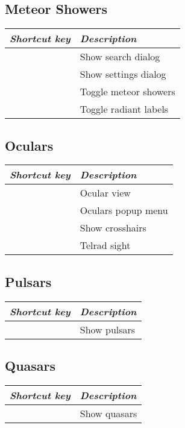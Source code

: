 \subsection{Meteor Showers}
\label{ch:Hotkeys:Plugins:MeteorShowers}
\begin{longtabu}to \textwidth {cl} 
\toprule
\emph{Shortcut key}		& \emph{Description}\\\midrule
{}		& Show search dialog \\
	& Show settings dialog \\
		& Toggle meteor showers \\
			& Toggle radiant labels \\
\bottomrule
\end{longtabu}

\subsection{Oculars}
\label{ch:Hotkeys:Plugins:Oculars}
\begin{longtabu}to \textwidth {cl} 
\toprule
\emph{Shortcut key}	& \emph{Description}\\\midrule
{}		& Ocular view \\
			& Oculars popup menu \\
			& Show crosshairs \\
		& Telrad sight \\
\bottomrule
\end{longtabu}

\subsection{Pulsars}
\label{ch:Hotkeys:Plugins:Pulsars}
\begin{longtabu}to \textwidth {cl} 
\toprule
\emph{Shortcut key}	& \emph{Description}\\\midrule
{}	& Show pulsars \\
\bottomrule
\end{longtabu}

\subsection{Quasars}
\label{ch:Hotkeys:Plugins:Quasars}
\begin{longtabu}to \textwidth {cl} 
\toprule
\emph{Shortcut key}	& \emph{Description}\\\midrule
{}	& Show quasars \\
\bottomrule
\end{longtabu}

